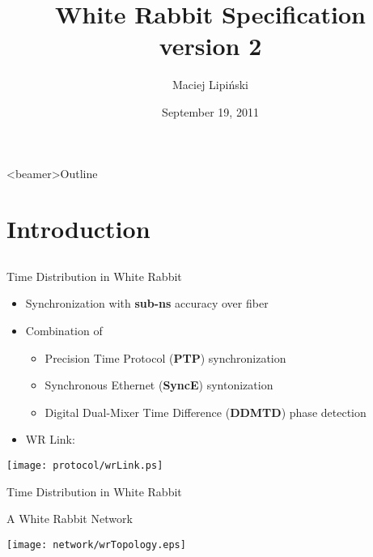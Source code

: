 \documentclass[compress,red]{beamer}
\title[White Rabbit Specification\hspace{2em}\insertframenumber/ \inserttotalframenumber]
{White Rabbit Specification \\ version 2}
\institute{
$5^{th}$ White Rabbit Workshop \\ CERN
}
\author{
Maciej Lipi\'{n}ski %
}
\date{September 19, 2011}
\begin{document}
\frame{\titlepage}
\begin{frame}<beamer>{Outline}

    \tableofcontents %

\end{frame}
\section{Introduction}
\subsection{}
\begin{frame}{Time Distribution in White Rabbit}

  \begin{itemize}
    \item Synchronization with {\bf sub-ns} accuracy over fiber
    \item Combination of
	\begin{itemize}
	  \item Precision Time Protocol ({\bf PTP}) synchronization
	  \item Synchronous Ethernet ({\bf SyncE}) syntonization
	  \item Digital Dual-Mixer Time Difference ({\bf DDMTD}) phase detection
	\end{itemize}
    \item WR Link:
  \end{itemize}

  \begin{center}
  \texttt{[image: protocol/wrLink.ps]}
  \end{center}

\end{frame}
\begin{frame}{Time Distribution in White Rabbit}

\center A White Rabbit Network
  \begin{center}
  \texttt{[image: network/wrTopology.eps]}
  \end{center}
\end{frame}
\end{document}
